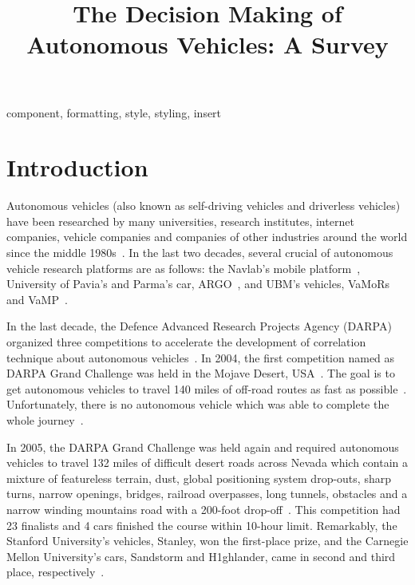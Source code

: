 \documentclass[conference]{IEEEtran}
\begin{document}
\title{The Decision Making of Autonomous Vehicles: A Survey}

\author{


}

\maketitle

\begin{abstract}

\end{abstract}

\begin{IEEEkeywords}
component, formatting, style, styling, insert
\end{IEEEkeywords}

\section{Introduction}
Autonomous vehicles (also known as self-driving vehicles and driverless vehicles) have been researched by many universities, research institutes, internet companies, vehicle companies and companies of other industries around the world since the middle 1980s~\cite{self_driving}. In the last two decades, several crucial of autonomous vehicle research platforms are as follows: the Navlab's mobile platform~\cite{Thorpe199144}, University of Pavia's and Parma's car, ARGO~\cite{Broggi199955}, and UBM's vehicles, VaMoRs and VaMP~\cite{Gregor200248}.

In the last decade, the Defence Advanced Research Projects Agency (DARPA) organized three competitions to accelerate the development of correlation technique about autonomous vehicles~\cite{Brian2016}. In 2004, the first competition named as DARPA Grand Challenge was held in the Mojave Desert, USA~\cite{self_driving}. The goal is to get autonomous vehicles to travel 140 miles of off-road routes as fast as possible~\cite{Brian2016}. Unfortunately, there is no autonomous vehicle which was able to complete the whole journey~\cite{self_driving}.

In 2005, the DARPA Grand Challenge was held again and required autonomous vehicles to travel 132 miles of difficult desert roads across Nevada which contain a mixture of featureless terrain, dust, global positioning system drop-outs, sharp turns, narrow openings, bridges, railroad overpasses, long tunnels, obstacles and a narrow winding mountains road with a 200-foot drop-off~\cite{Buehler2007}. This competition had 23 finalists and 4 cars finished the course within 10-hour limit. Remarkably, the Stanford University's vehicles, Stanley, won the first-place prize, and the Carnegie Mellon University's cars, Sandstorm and H1ghlander, came in second and third place, respectively~\cite{Buehler2007}.
\end{document}
